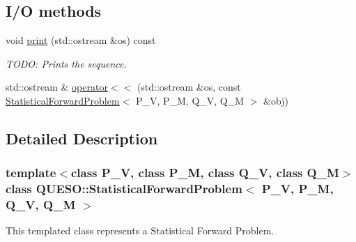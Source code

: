 \subsection*{I/\-O methods}
\begin{DoxyCompactItemize}
\item 
void \hyperlink{class_q_u_e_s_o_1_1_statistical_forward_problem_a023244862152f4398c4544e9239fe32a}{print} (std\-::ostream \&os) const 
\begin{DoxyCompactList}\small\item\em T\-O\-D\-O\-: Prints the sequence. \end{DoxyCompactList}\item 
std\-::ostream \& \hyperlink{class_q_u_e_s_o_1_1_statistical_forward_problem_aee8ed5dc90b8ecfd9536e60b393376ee}{operator$<$$<$} (std\-::ostream \&os, const \hyperlink{class_q_u_e_s_o_1_1_statistical_forward_problem}{Statistical\-Forward\-Problem}$<$ P\-\_\-\-V, P\-\_\-\-M, Q\-\_\-\-V, Q\-\_\-\-M $>$ \&obj)
\end{DoxyCompactItemize}


\subsection{Detailed Description}
\subsubsection*{template$<$class P\-\_\-\-V, class P\-\_\-\-M, class Q\-\_\-\-V, class Q\-\_\-\-M$>$class Q\-U\-E\-S\-O\-::\-Statistical\-Forward\-Problem$<$ P\-\_\-\-V, P\-\_\-\-M, Q\-\_\-\-V, Q\-\_\-\-M $>$}

This templated class represents a Statistical Forward Problem. 

